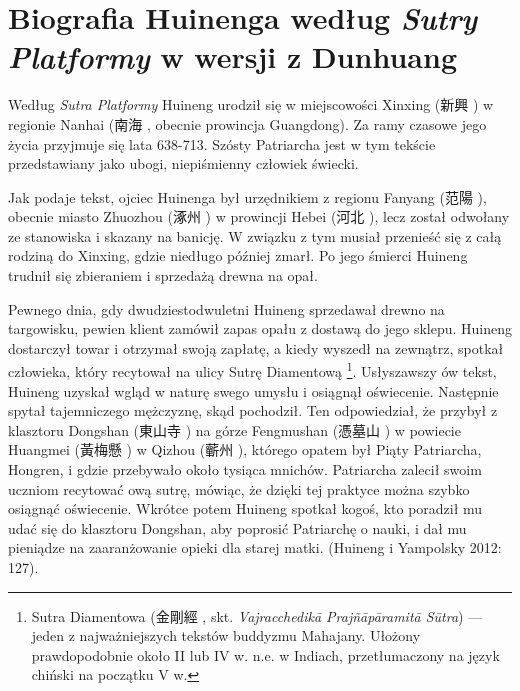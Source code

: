 \section{Biografia Huinenga według \textit{Sutry Platformy} w wersji z Dunhuang}
Według \textit{Sutra Platformy} Huineng urodził się w miejscowości Xinxing (新興 ) w regionie Nanhai (南海 , obecnie prowincja Guangdong). Za ramy czasowe jego życia przyjmuje się lata 638-713. Szósty Patriarcha jest w tym tekście przedstawiany jako ubogi, niepiśmienny człowiek świecki.

Jak podaje tekst, ojciec Huinenga był urzędnikiem z regionu Fanyang (范陽 ), obecnie miasto Zhuozhou (涿州 ) w prowincji Hebei (河北 ), lecz został odwołany ze stanowiska i skazany na banicję. W związku z tym musiał przenieść się z całą rodziną do Xinxing, gdzie niedługo później zmarł. Po jego śmierci Huineng trudnił się zbieraniem i sprzedażą drewna na opał.

Pewnego dnia, gdy dwudziestodwuletni Huineng sprzedawał drewno na targowisku, pewien klient zamówił zapas opału z dostawą do jego sklepu.
Huineng dostarczył towar i otrzymał swoją zapłatę, a kiedy wyszedł na zewnątrz, spotkał człowieka, który recytował na ulicy Sutrę Diamentową%
\footnote{Sutra Diamentowa (金剛經 , skt. \textit{Vajracchedikā Prajñāpāramitā Sūtra}) --- jeden z najważniejszych tekstów buddyzmu Mahajany. Ułożony prawdopodobnie około II lub IV w. n.e. w Indiach, przetłumaczony na język chiński na początku V w.}.\label{DiamondSutra}
Usłyszawszy ów tekst, Huineng uzyskał wgląd w naturę swego umysłu i osiągnął oświecenie. Następnie spytał tajemniczego mężczyznę, skąd pochodził.
Ten odpowiedział, że przybył z klasztoru Dongshan (東山寺 ) na górze Fengmushan (憑墓山 ) w powiecie Huangmei (黃梅懸 ) w Qizhou (蘄州 ), którego opatem był Piąty Patriarcha, Hongren, i gdzie przebywało około tysiąca mnichów.
Patriarcha zalecił swoim uczniom recytować ową sutrę, mówiąc, że dzięki tej praktyce można szybko osiągnąć oświecenie.
Wkrótce potem Huineng spotkał kogoś, kto poradził mu udać się do klasztoru Dongshan, aby poprosić Patriarchę o nauki, i dał mu pieniądze na zaaranżowanie opieki dla starej matki.
(Huineng i Yampolsky 2012: 127).

